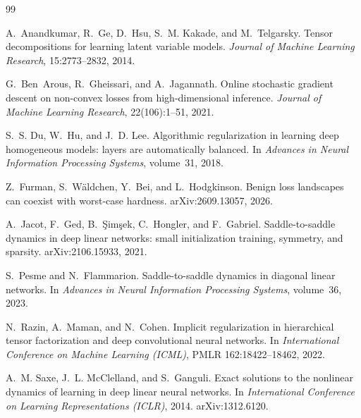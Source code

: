 \documentclass[11pt]{article}
\theoremstyle{definition}
\numberwithin{equation}{section}
\begin{document}
\begin{thebibliography}{99}
\providecommand{\natexlab}[1]{#1}

A.~Anandkumar, R.~Ge, D.~Hsu, S.~M. Kakade, and M.~Telgarsky.
\newblock Tensor decompositions for learning latent variable models.
\newblock \emph{Journal of Machine Learning Research}, 15:2773--2832, 2014.

G.~Ben~Arous, R.~Gheissari, and A.~Jagannath.
\newblock Online stochastic gradient descent on non-convex losses from high-dimensional inference.
\newblock \emph{Journal of Machine Learning Research}, 22(106):1--51, 2021.

S.~S. Du, W.~Hu, and J.~D. Lee.
\newblock Algorithmic regularization in learning deep homogeneous models: layers are automatically balanced.
\newblock In \emph{Advances in Neural Information Processing Systems}, volume~31, 2018.

Z.~Furman, S.~W\"aldchen, Y.~Bei, and L.~Hodgkinson.
\newblock Benign loss landscapes can coexist with worst-case hardness.
\newblock arXiv:2609.13057, 2026.

A.~Jacot, F.~Ged, B.~\c{S}im\c{s}ek, C.~Hongler, and F.~Gabriel.
\newblock Saddle-to-saddle dynamics in deep linear networks: small initialization training, symmetry, and sparsity.
\newblock arXiv:2106.15933, 2021.

S.~Pesme and N.~Flammarion.
\newblock Saddle-to-saddle dynamics in diagonal linear networks.
\newblock In \emph{Advances in Neural Information Processing Systems}, volume~36, 2023.

N.~Razin, A.~Maman, and N.~Cohen.
\newblock Implicit regularization in hierarchical tensor factorization and deep convolutional neural networks.
\newblock In \emph{International Conference on Machine Learning (ICML)}, PMLR 162:18422--18462, 2022.

A.~M. Saxe, J.~L. McClelland, and S.~Ganguli.
\newblock Exact solutions to the nonlinear dynamics of learning in deep linear neural networks.
\newblock In \emph{International Conference on Learning Representations (ICLR)}, 2014. arXiv:1312.6120.

\end{thebibliography}
\end{document}
